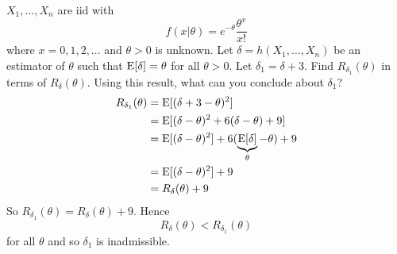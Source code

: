 \documentclass[12pt]{article}
\begin{document}
\begin{question} $X_1,\dots,X_n$ are iid with $$f(x | \theta) = e^{-\theta} \frac{\theta^x}{x!}$$ where $x = 0,1,2,\dots$ and $\theta > 0$ is unknown. Let $\delta = h(X_1,\dots,X_n)$ be an estimator of $\theta$ such that $\mathrm{E}[ \delta ] = \theta$ for all $\theta > 0$. Let $\delta_1 = \delta + 3$. Find $R_{\delta_1}(\theta)$ in terms of $R_\delta(\theta)$. Using this result, what can you conclude about $\delta_1$? 
$$ \begin{aligned} R_{\delta_1}(\theta) &= \mathrm{E}[ (\delta+3-\theta)^2 ] \\ &= \mathrm{E}[ (\delta-\theta)^2 + 6(\delta - \theta) + 9 ] \\ &= \mathrm{E}[ (\delta - \theta)^2 ] + 6(\underbrace{\mathrm{E}[ \delta ]}_\theta - \theta) + 9 \\ &= \mathrm{E}[ (\delta - \theta)^2 ] + 9 \\ &= R_\delta(\theta) + 9 \end{aligned} $$ 
So $R_{\delta_1}(\theta) = R_{\delta}(\theta) + 9$. Hence $$ R_\delta(\theta) < R_{\delta_1}(\theta) $$ for all $\theta$ and so $\delta_1$ is inadmissible. 

\end{question}
\end{document}
